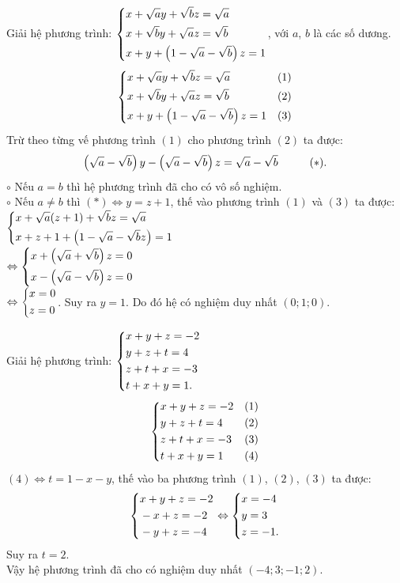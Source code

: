 \begin{ex}%
 Giải hệ phương trình: $\left\{\begin{aligned}& x+\sqrt{a}y+\sqrt{b}z=\sqrt{a} \\& x+\sqrt{b}y+\sqrt{a}z=\sqrt{b} \\& x+y+\left(1-\sqrt{a}-\sqrt{b}\right)z=1\end{aligned}\right.$, với $a$, $b$ là các số dương.
 \loigiai
  {
  $$\left\{\begin{aligned}& x+\sqrt{a}y+\sqrt{b}z=\sqrt{a} & (1) \\& x+\sqrt{b}y+\sqrt{a}z=\sqrt{b} & (2) \\& x+y+\left(1-\sqrt{a}-\sqrt{b}\right)z=1 & (3)\end{aligned}\right.$$
  Trừ theo từng vế phương trình $(1)$ cho phương trình $(2)$ ta được:
  $$\left( \sqrt{a} - \sqrt{b} \right)y - \left( \sqrt{a} - \sqrt{b} \right)z = \sqrt{a} - \sqrt{b} \hspace*{1cm} (*).$$ 
  $\circ$ Nếu $a = b$ thì hệ phương trình đã cho có vô số nghiệm.\\
  $\circ$ Nếu $a \neq b$ thì $(*) \Leftrightarrow y = z + 1$, thế vào phương trình $(1)$ và $(3)$ ta được:\\
  \hspace*{0.5cm}$\left\{\begin{aligned}&x + \sqrt{a}(z+1) + \sqrt{b}z = \sqrt{a} \\& x + z+1 + \left( 1-\sqrt{a}-\sqrt{b}z \right) = 1\end{aligned}\right.$\\
  $\Leftrightarrow \left\{\begin{aligned}& x + \left( \sqrt{a} + \sqrt{b} \right)z = 0 \\& x - \left( \sqrt{a} - \sqrt{b} \right)z = 0\end{aligned}\right.$\\
  $\Leftrightarrow \left\{\begin{aligned}& x = 0 \\& z = 0\end{aligned}\right.$. Suy ra $y = 1$. Do đó hệ có nghiệm duy nhất $(0;1;0)$.
  }
\end{ex}


\begin{ex}%
 Giải hệ phương trình: $\left\{\begin{aligned}& x+y+z=-2 \\& y+z+t=4 \\& z+t+x=-3 \\& t+x+y=1.\end{aligned}\right.$
 \loigiai
  {
  $$\left\{\begin{aligned}& x+y+z=-2 & (1) \\& y+z+t=4 & (2) \\& z+t+x=-3 & (3) \\& t+x+y=1 & (4)\end{aligned}\right.$$
  $(4) \Leftrightarrow t = 1-x-y$, thế vào ba phương trình $(1)$, $(2)$, $(3)$ ta được:
  $$\left\{\begin{aligned}& x+y+z=-2 \\& -x+z=-2 \\& -y+z=-4\end{aligned}\right. \Leftrightarrow \left\{\begin{aligned}& x=-4 \\& y=3 \\& z=-1.\end{aligned}\right.$$
  Suy ra $t = 2$.\\
  Vậy hệ phương trình đã cho có nghiệm duy nhất $(-4;3;-1;2)$.
  }
\end{ex}


